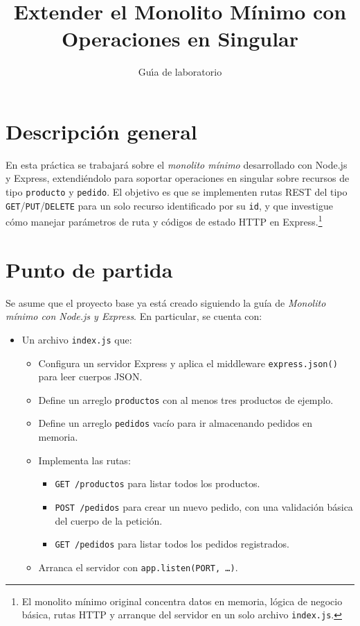 \documentclass[11pt,a4paper]{article}
\title{Extender el Monolito Mínimo con Operaciones en Singular}
\author{Gu\'{\i}a de laboratorio}
\date{}
\begin{document}
	
	\maketitle
	
\section{Descripción general}
	En esta práctica se trabajará sobre el \emph{monolito mínimo} desarrollado con Node.js y Express, extendiéndolo para soportar operaciones en singular sobre recursos de tipo \texttt{producto} y \texttt{pedido}. El objetivo es que se implementen rutas REST del tipo \texttt{GET}/\texttt{PUT}/\texttt{DELETE} para un solo recurso identificado por su \texttt{id}, y que investigue cómo manejar parámetros de ruta y códigos de estado HTTP en Express.\footnote{El monolito mínimo original concentra datos en memoria, lógica de negocio básica, rutas HTTP y arranque del servidor en un solo archivo \texttt{index.js}.}
	
\section{Punto de partida}

Se asume que el proyecto base ya está creado siguiendo la guía de \emph{Monolito mínimo con Node.js y Express}. En particular, se cuenta con:

\begin{itemize}
	\item Un archivo \texttt{index.js} que:
	\begin{itemize}
		\item Configura un servidor Express y aplica el middleware \texttt{express.json()} para leer cuerpos JSON.
		\item Define un arreglo \texttt{productos} con al menos tres productos de ejemplo.
		\item Define un arreglo \texttt{pedidos} vacío para ir almacenando pedidos en memoria.
		\item Implementa las rutas:
		\begin{itemize}
			\item \texttt{GET /productos} para listar todos los productos.
			\item \texttt{POST /pedidos} para crear un nuevo pedido, con una validación básica del cuerpo de la petición.
			\item \texttt{GET /pedidos} para listar todos los pedidos registrados.
		\end{itemize}
		\item Arranca el servidor con \texttt{app.listen(PORT, \dots)}.
	\end{itemize}
\end{itemize}
\end{document}
